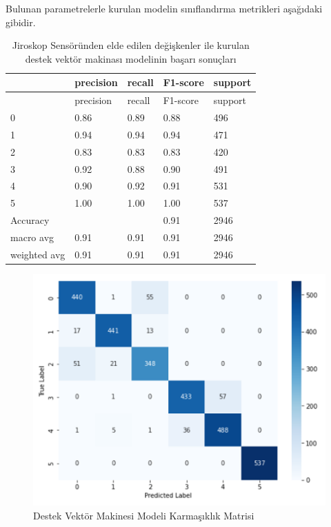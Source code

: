\documentclass[12pt,twoside]{deuthesis}
\begin{document}
Bulunan parametrelerle kurulan modelin sınıflandırma metrikleri aşağıdaki gibidir.
\begin{longtable}[]{@{}lllll@{}}
\caption{\label{tab:jsvm} Jiroskop Sensöründen elde edilen değişkenler ile kurulan destek vektör makinası modelinin başarı sonuçları}\tabularnewline
\toprule()
& precision & recall & F1-score & support \\
\midrule()
\endfirsthead
\toprule()
& precision & recall & F1-score & support \\
\midrule()
\endhead
0 & 0.86 & 0.89 & 0.88 & 496 \\
1 & 0.94 & 0.94 & 0.94 & 471 \\
2 & 0.83 & 0.83 & 0.83 & 420 \\
3 & 0.92 & 0.88 & 0.90 & 491 \\
4 & 0.90 & 0.92 & 0.91 & 531 \\
5 & 1.00 & 1.00 & 1.00 & 537 \\
Accuracy & & & 0.91 & 2946 \\
macro avg & 0.91 & 0.91 & 0.91 & 2946 \\
weighted avg & 0.91 & 0.91 & 0.91 & 2946 \\
\bottomrule()
\end{longtable}
\begin{figure}

{\centering \includegraphics[width=0.9\linewidth,height=0.35\textheight]{figure/svm_confmat} 

}

\caption{Destek Vektör Makinesi Modeli Karmaşıklık Matrisi}\label{fig:svmconfmat}
\end{figure}
\end{document}
